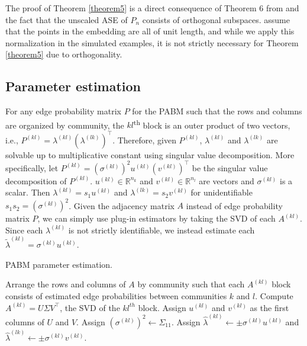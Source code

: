 \documentclass[12pt]{article}
\begin{document}
\begin{remark}
The proof of Theorem \ref{theorem5} is a direct consequence of Theorem 6
from  \citeauthor{jmlr-v28-wang13} and the fact that the unscaled ASE of
$P_n$ consists of orthogonal subspaces. \citeauthor{jmlr-v28-wang13} assume
that the points in the embedding are all of unit length, and while we apply
this normalization in the simulated examples, it is not strictly necessary
for Theorem \ref{theorem5} due to orthogonality.
\end{remark}

\hypertarget{parameter-estimation}{%
\subsection{Parameter estimation}\label{parameter-estimation}}

For any edge probability matrix \(P\) for the PABM such that the rows
and columns are organized by community, the \(kl\)\textsuperscript{th}
block is an outer product of two vectors, i.e.,
\(P^{(kl)} = \lambda^{(kl)} (\lambda^{(lk)})^\top\). Therefore, given
\(P^{(kl)}\), \(\lambda^{(kl)}\) and \(\lambda^{(lk)}\) are solvable
up to multiplicative constant using singular value
decomposition. More specifically, 
let \(P^{(kl)} = (\sigma^{(kl)})^2 u^{(kl)} (v^{(kl)})^\top\)
be the singular value decomposition of \(P^{(kl)}\).
\(u^{(kl)} \in \mathbb{R}^{n_k}\) and 
\(v^{(kl)} \in \mathbb{R}^{n_l}\) are vectors
and \(\sigma^{(kl)}\) is a scalar. Then \(\lambda^{(kl)} = s_1 u^{(kl)}\)
and \(\lambda^{(lk)} = s_2 v^{(kl)}\) 
for unidentifiable $s_1 s_2 = (\sigma^{(kl)})^2$.
Given the adjacency matrix \(A\)
instead of edge probability matrix \(P\), we can simply use plug-in
estimators by taking the SVD of each $A^{(kl)}$. 
Since each $\lambda^{(kl)}$ is not strictly identifiable,
we instead estimate each $\tilde{\lambda}^{(kl)} = \sigma^{(kl)} u^{(kl)}$. 

\begin{algorithm}[t]
  \DontPrintSemicolon
  \SetAlgoLined
  \caption{PABM parameter estimation.}
  Arrange the rows and columns of $A$ by community such that each 
  $A^{(kl)}$ block consists of estimated edge probabilities between 
  communities $k$ and $l$.\;
   {
    Compute $A^{(kl)} = U \Sigma V^\top$, the SVD of the $kl^{th}$ 
    block.\;
    Assign $u^{(kl)}$ and $v^{(kl)}$ as the first columns of $U$ and $V$. 
    Assign $(\sigma^{(kl)})^2 \leftarrow \Sigma_{11}$.\;
    Assign $\hat{\lambda}^{(kl)} \leftarrow \pm \sigma^{(kl)} u^{(kl)}$ and 
    $\hat{\lambda}^{(lk)} \leftarrow \pm \sigma^{(kl)} v^{(kl)}$.
  }
\end{algorithm}
\end{document}
